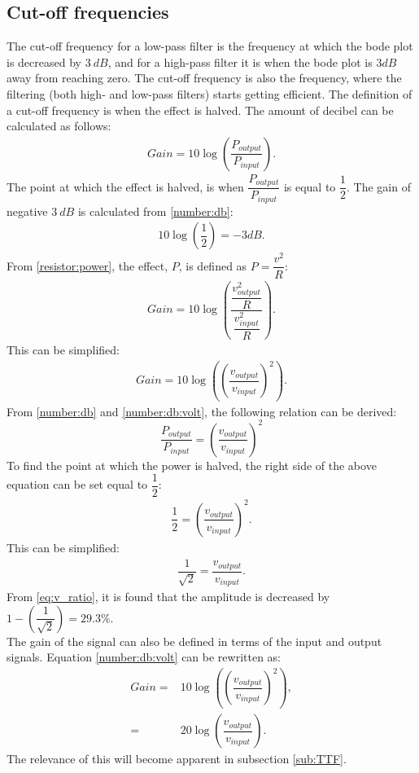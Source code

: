 \subsection{Cut-off frequencies}
The cut-off frequency for a low-pass filter is the frequency at which the bode plot is decreased by $3\ dB$, and for a high-pass filter it is when the bode plot is $3dB$ away from reaching zero. The cut-off frequency is also the frequency, where the filtering (both high- and low-pass filters) starts getting efficient. The definition of a cut-off frequency is when the effect is halved. The amount of decibel can be calculated as follows: \cite[p. 596-597]{bcircuit}
\begin{align} \label{number:db}
Gain = 10 \log \left(\dfrac{P_{output}}{P_{input}} \right).
\end{align}
The point at which the effect is halved, is when $\dfrac{P_{output}}{P_{input}}$ is equal to $\dfrac{1}{2}$. The gain of negative $3\ dB$ is calculated from \eqref{number:db}:
\begin{align*} 
10 \log \left(\dfrac{1}{2} \right) = -3 dB.
\end{align*}
From \eqref{resistor:power}, the effect, $P$, is defined as $P=\dfrac{v^2}{R}$:
\begin{align*}
Gain = 10 \log \left(\dfrac{\dfrac{v_{output}^2}{R}}{\dfrac{v_{input}^2}{R}} \right).
\end{align*}
This can be simplified:
\begin{align} \label{number:db:volt}
Gain = 10 \log \left(\left(\dfrac{v_{output}}{v_{input}} \right)^2\right).
\end{align}
From \eqref{number:db} and \eqref{number:db:volt}, the following relation can be derived: $$\dfrac{P_{output}}{P_{input}}= \left(\dfrac{v_{output}}{v_{input}} \right)^2$$ To find the point at which the power is halved, the right side of the above equation can be set equal to $\dfrac{1}{2}$:
\begin{align*}
\dfrac{1}{2}= \left(\dfrac{v_{output}}{v_{input}} \right)^2.
\end{align*}
This can be simplified:
\begin{align} \label{eq:v_ratio}
\dfrac{1}{\sqrt{2}}= \dfrac{v_{output}}{v_{input}}.
\end{align}
From \eqref{eq:v_ratio}, it is found that the amplitude is decreased by $1-\left(\dfrac{1}{\sqrt{2}} \right) = 29.3\%$. 
\\
The gain of the signal can also be defined in terms of the input and output signals. Equation \eqref{number:db:volt} can be rewritten as:
\begin{align*}
	Gain =& 10 \log \left(\left(\dfrac{v_{output}}{v_{input}} \right)^2\right),
	\\
	     =& 20 \log \left(\dfrac{v_{output}}{v_{input}} \right).
\end{align*}
The relevance of this will become apparent in subsection \ref{sub:TTF}.

